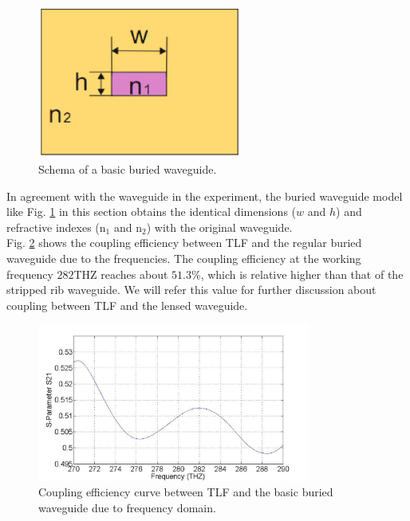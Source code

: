 \begin{figure}[!ht]
\centering
\includegraphics[width=0.6\textwidth]{bilder/buried_waveguide}
\caption{Schema of a basic buried waveguide.}
\label{fig:buried_waveguide}
\end{figure}
In agreement with the waveguide in the experiment, the buried waveguide model like Fig. \ref{fig:buried_waveguide} in this section obtains the identical dimensions ($w$ and $h$) and refractive indexes (n$_{1}$ and n$_{2}$) with the original waveguide.\\ 
Fig. \ref{fig:curve_coupling_basic_buried_waveguide} shows the coupling efficiency between TLF and the regular buried waveguide due to the frequencies. The coupling efficiency at the working frequency $282$THZ reaches about $51.3\%$, which is relative higher than that of the stripped rib waveguide. We will refer this value for further discussion about coupling between TLF and the lensed waveguide.  
\begin{figure}[!ht]
\centering
\includegraphics[width=0.8\textwidth]{bilder/s21_sym_waveguide}
\caption{Coupling efficiency curve between TLF and the basic buried waveguide due to frequency domain.}
\label{fig:curve_coupling_basic_buried_waveguide}
\end{figure}
